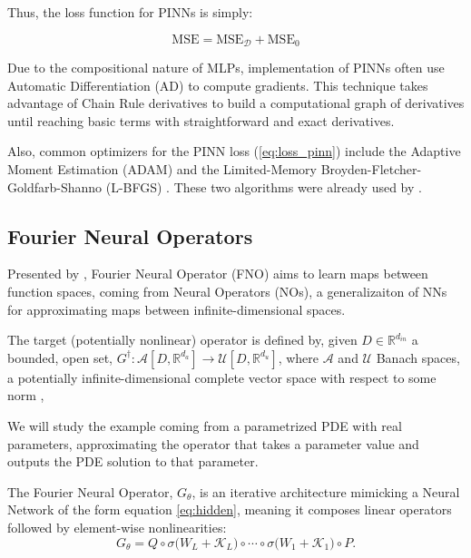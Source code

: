 Thus, the loss function for PINNs is simply:

\begin{equation}
    \text{MSE} = \text{MSE}_\mathcal{D} + \text{MSE}_0 \label{eq:loss_pinn}
\end{equation}

Due to the compositional nature of MLPs, implementation of PINNs often use
Automatic Differentiation (AD) \parencite{linnainmaa1970, paszke2019pytorch} to
compute gradients. This technique takes advantage of Chain Rule derivatives to
build a computational graph of derivatives until reaching basic terms with
straightforward and exact derivatives.

Also, common optimizers for the PINN loss (\ref{eq:loss_pinn}) include the
Adaptive Moment Estimation (ADAM) \parencite{kingma2014adam} and the
Limited-Memory Broyden-Fletcher-Goldfarb-Shanno (L-BFGS)
\parencite{nocedal1980lbfgs}. These two algorithms were already used by
\textcite{raissi2017}.

\subsection{Fourier Neural Operators}

Presented by \textcite{li2020fourier}, Fourier Neural Operator (FNO) aims to
learn maps between function spaces, coming from Neural Operators (NOs), a
generalizaiton of NNs for approximating maps between infinite-dimensional
spaces.

The target (potentially nonlinear) operator is defined by, given $D \in
    \mathbb{R}^{d_{in}}$ a bounded, open set, $G^{\dagger} : \mathcal{A} [D,
        \mathbb{R}^{d_{a}} ] \to \mathcal{U} [D, \mathbb{R}^{d_{u}}]$, where
$\mathcal{A}$ and $\mathcal{U}$ Banach spaces, a potentially
infinite-dimensional complete vector space with respect to some norm
\parencite{kreyszig1978introductory},

We will study the example coming from a parametrized PDE with real parameters,
approximating the operator that takes a parameter value and outputs the PDE
solution to that parameter.

The Fourier Neural Operator, $G_\theta$, is an iterative architecture mimicking a Neural Network of the form equation \ref{eq:hidden}, meaning it composes linear operators followed by element-wise nonlinearities:
\begin{equation}
    G_\theta = Q \circ \sigma\Big(W_L + \mathcal{K}_L\Big) \circ \cdots \circ \sigma\Big(W_1 + \mathcal{K}_1\Big) \circ P.
\end{equation}

